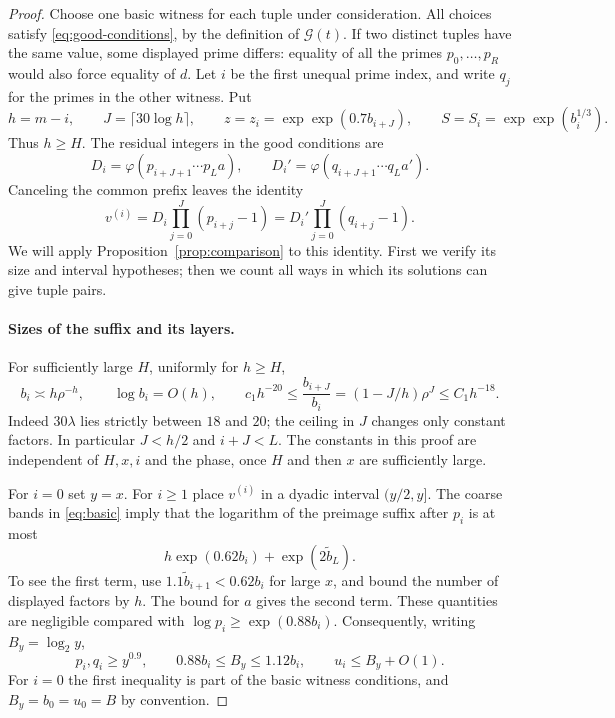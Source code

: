 \begin{proof}
Choose one basic witness for each tuple under consideration.  All choices
satisfy \eqref{eq:good-conditions}, by the definition of $\mathcal G(t)$.
If two distinct tuples have the same value, some displayed prime differs:
equality of all the primes $p_0,\ldots,p_R$ would also force equality of
$d$.  Let $i$ be the first unequal prime index, and write $q_j$ for the
primes in the other witness.  Put
\[
 h=m-i,\qquad J=\lceil30\log h\rceil,\qquad
 z=z_i=\exp\exp(0.7b_{i+J}),\qquad S=S_i=\exp\exp(b_i^{1/3}).
\]
Thus $h\ge H$.  The residual integers in the good conditions are
\[
 D_i=\varphi(p_{i+J+1}\cdots p_La),\qquad
 D_i'=\varphi(q_{i+J+1}\cdots q_La').
\]
Canceling the common prefix leaves the identity
\begin{equation}\label{eq:suffix-identity}
 v^{(i)}=D_i\prod_{j=0}^{J}(p_{i+j}-1)
        =D_i'\prod_{j=0}^{J}(q_{i+j}-1).
\end{equation}
We will apply Proposition~\ref{prop:comparison} to this identity.  First
we verify its size and interval hypotheses; then we count all ways in
which its solutions can give tuple pairs.

\paragraph{Sizes of the suffix and its layers.}
For sufficiently large $H$, uniformly for $h\ge H$,
\begin{equation}\label{eq:collision-scales}
 b_i\asymp h\rho^{-h},\qquad
 \log b_i=O(h),\qquad
 c_1h^{-20}\le\frac{b_{i+J}}{b_i}
       =(1-J/h)\rho^J\le C_1h^{-18}.
\end{equation}
Indeed $30\lambda$ lies strictly between $18$ and $20$; the ceiling in
$J$ changes only constant factors.  In particular $J<h/2$ and
$i+J<L$.  The constants in this proof are independent of $H,x,i$ and the
phase, once $H$ and then $x$ are sufficiently large.

For $i=0$ set $y=x$.  For $i\ge1$ place $v^{(i)}$ in a dyadic interval
$(y/2,y]$.  The coarse bands in \eqref{eq:basic} imply that the logarithm
of the preimage suffix after $p_i$ is at most
\[
 h\exp(0.62b_i)+\exp(2\widetilde b_L).
\]
To see the first term, use
$1.1\widetilde b_{i+1}<0.62b_i$ for large $x$, and bound the number of
displayed factors by $h$.  The bound for $a$ gives the second term.
These quantities are negligible compared with
$\log p_i\ge\exp(0.88b_i)$.  Consequently, writing $B_y=\log_2y$,
\begin{equation}\label{eq:suffix-sizes}
 p_i,q_i\ge y^{0.9},\qquad
 0.88b_i\le B_y\le1.12b_i,\qquad u_i\le B_y+O(1).
\end{equation}
For $i=0$ the first inequality is part of the basic witness conditions,
and $B_y=b_0=u_0=B$ by convention.


\end{proof}
